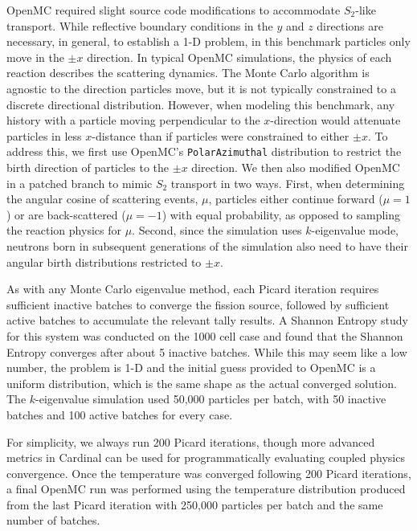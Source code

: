 \documentclass[letterpaper]{mc2023}
\begin{document}
OpenMC required slight source code modifications to accommodate $S_2$-like transport. While reflective boundary conditions in the
$y$ and $z$ directions are necessary, in general, to establish a 1-D problem, in this benchmark particles only move in the $\pm x$
direction. In typical OpenMC simulations, the physics of each reaction describes the scattering dynamics. The Monte Carlo algorithm
is agnostic to the direction particles move, but it is not typically constrained to a discrete directional distribution. However,
when modeling this benchmark, any history with a particle moving perpendicular to the $x$-direction would attenuate particles in less
$x$-distance than if particles were constrained to either $\pm x$. To address this, we first use OpenMC's \texttt{PolarAzimuthal}
distribution to restrict the birth direction of particles to the $\pm x$ direction. We then also modified OpenMC in a patched branch
to mimic $S_{2}$ transport in two ways. First, when determining the angular cosine of scattering events, $\mu$, particles either
continue forward ($\mu=1$) or are back-scattered ($\mu=-1$) with equal probability, as opposed to sampling the reaction physics
for $\mu$. Second, since the simulation uses $k$-eigenvalue mode, neutrons born in subsequent generations of the simulation also
need to have their angular birth distributions restricted to $\pm x$.

As with any Monte Carlo eigenvalue method, each Picard iteration requires sufficient inactive batches to converge the fission source,
followed by sufficient active batches to accumulate the relevant tally results. A Shannon Entropy \cite{brown-entropy-2006} study for
this system was conducted on the 1000 cell case and found that the Shannon Entropy converges after about 5 inactive batches. While this
may seem like a low number, the problem is 1-D and the initial guess provided to OpenMC is a uniform distribution, which is the same
shape as the actual converged solution. The $k$-eigenvalue simulation used 50,000 particles per batch, with 50 inactive batches and
100 active batches for every case.

For simplicity, we always run 200 Picard iterations, though more advanced metrics in Cardinal can be used for programmatically
evaluating coupled physics convergence. Once the temperature was converged following 200 Picard iterations, a final OpenMC run was
performed using the temperature distribution produced from the last Picard iteration with 250,000 particles per batch and the same
number of batches.
\end{document}
